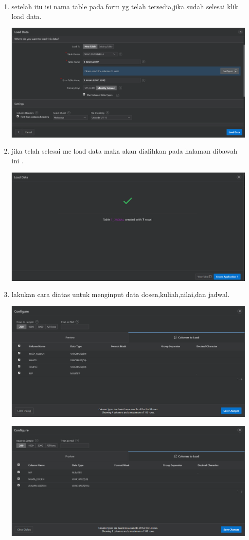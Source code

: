 \documentclass{article}
\begin{document}
\begin{enumerate}
\begin{center}
\end{center}
\item setelah itu isi nama table pada form yg telah tersedia,jika sudah selesai klik load data.
\begin{center}
    \includegraphics[width=.8\textwidth]{figure/9.PNG}
\end{center}
    \item jika telah selesai me load data maka akan dialihkan pada halaman dibawah ini .
    \begin{center}
    \includegraphics[width=.8\textwidth]{figure/12.PNG}
\end{center}
    \item lakukan cara diatas untuk menginput data dosen,kuliah,nilai,dan jadwal.
    \begin{center}
    \includegraphics[width=.8\textwidth]{figure/19.PNG}
\end{center}
\begin{center}
    \includegraphics[width=.8\textwidth]{figure/21.PNG}

\end{center}
\end{enumerate}
\end{document}
